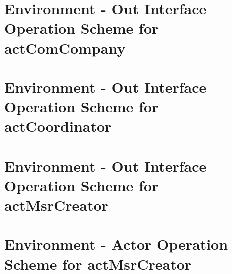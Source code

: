 \section{Environment - Out Interface Operation Scheme for actComCompany}
\label{OM-EM-OutInterface-OS-actComCompany}

\section{Environment - Out Interface Operation Scheme for actCoordinator}
\label{OM-EM-OutInterface-OS-actCoordinator}










\section{Environment - Out Interface Operation Scheme for actMsrCreator}
\label{OM-EM-OutInterface-OS-actMsrCreator}



		
\section{Environment - Actor Operation Scheme for actMsrCreator}
\label{OM-EM-actMsrCreator}
 



